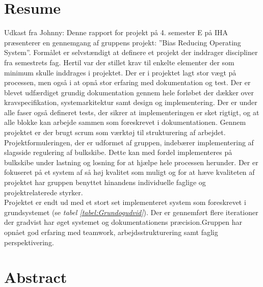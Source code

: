 \chapter{Resume}
Udkast fra Johnny:
Denne rapport for projekt på 4. semester E på IHA præsenterer en gennemgang af gruppens projekt: ”Bias Reducing Operating System”. Formålet er selvstændigt at definere et projekt der inddrager discipliner fra semestrets fag. Hertil var der stillet krav til enkelte elementer der som minimum skulle inddrages i projektet. Der er i projektet lagt stor vægt på processen, men også i at opnå stor erfaring med dokumentation og test. Der er blevet udfærdiget grundig dokumentation gennem hele forløbet der dækker over kravspecifikation, systemarkitektur samt design og implementering. Der er under alle faser også defineret tests, der sikrer at implementeringen er sket rigtigt, og at alle blokke kan arbejde sammen som foreskrevet i dokumentationen. Gennem projektet er der brugt scrum som værktøj til strukturering af arbejdet.\\

Projektformuleringen, der er udformet af gruppen, indebærer implementering af slagsside regulering af bulkskibe. Dette kan med fordel implementeres på bulkskibe under lastning og losning for at hjælpe hele processen herunder. Der er fokuseret på et system af så høj kvalitet som muligt og for at hæve kvaliteten af projektet har gruppen benyttet hinandens individuelle faglige og projektrelaterede styrker.\\

Projektet er endt ud med et stort set implementeret system som foreskrevet i grundsystemet (se \textit{tabel \ref{tabel:Grundogudvid}}). Der er gennemført flere iterationer der gradvist har øget systemet og dokumentationens præcision.Gruppen har opnået god erfaring med teamwork, arbejdsstrukturering samt faglig perspektivering.

\chapter{Abstract}

\newpage
